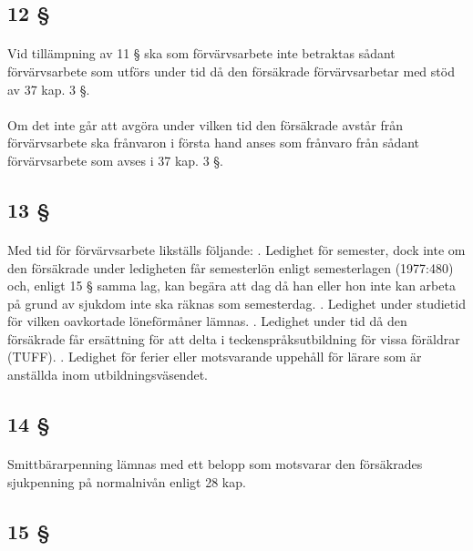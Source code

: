 \documentclass[a4paper,notitlepage,openany,10pt]{book}
\begin{document}
\subsection*{12 §}
\paragraph*{}
Vid tillämpning av 11 § ska som förvärvsarbete inte betraktas sådant förvärvsarbete som utförs under tid då den försäkrade förvärvsarbetar med stöd av 37 kap. 3 §.
\paragraph*{}
Om det inte går att avgöra under vilken tid den försäkrade avstår från förvärvsarbete ska frånvaron i första hand anses som frånvaro från sådant förvärvsarbete som avses i 37 kap. 3 §.
\subsection*{13 §}
\paragraph*{}
Med tid för förvärvsarbete likställs följande:
. Ledighet för semester, dock inte om den försäkrade under ledigheten får semesterlön enligt semesterlagen (1977:480) och, enligt 15 § samma lag, kan begära att dag då han eller hon inte kan arbeta på grund av sjukdom inte ska räknas som semesterdag.
. Ledighet under studietid för vilken oavkortade löneförmåner lämnas.
. Ledighet under tid då den försäkrade får ersättning för att delta i teckenspråksutbildning för vissa föräldrar (TUFF).
. Ledighet för ferier eller motsvarande uppehåll för lärare som är anställda inom utbildningsväsendet.
\subsection*{14 §}
\paragraph*{}
Smittbärarpenning lämnas med ett belopp som motsvarar den försäkrades sjukpenning på normalnivån enligt 28 kap.
\subsection*{15 §}
\end{document}
